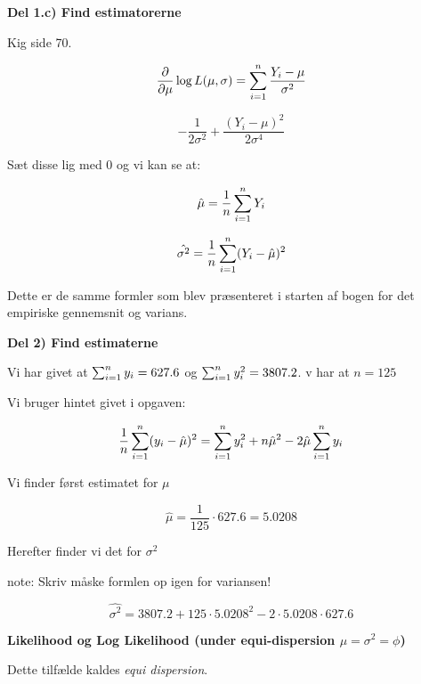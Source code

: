 \textbf{Del 1.c) Find estimatorerne}

Kig side 70.

\begin{equation}
    \frac{\partial}{\partial \mu} \log L (\mu, \sigma) = \sum_{i=1}^{n} \frac{Y_i - \mu}{\sigma^2}
\end{equation}

\begin{equation}
    - \frac{1}{2\sigma^2} + \frac{(Y_i - \mu)^2}{2\sigma^4}
\end{equation}

Sæt disse lig med 0 og vi kan se at:

\begin{equation}
    \hat{\mu} = \frac{1}{n}\sum_{i=1}^{n} Y_i
\end{equation}

\begin{equation}
    \hat{\sigma^2} = \frac{1}{n}\sum_{i=1}^{n} (Y_i - \hat{\mu})^2
\end{equation}

Dette er de samme formler som blev præsenteret i starten af bogen for det empiriske gennemsnit og varians.

\textbf{Del 2) Find estimaterne}

Vi har givet at $\sum_{i=1}^{n} y_i = 627.6$ og $\sum_{i=1}^{n} y_i^2 = 3807.2$. v har at $n=125$

Vi bruger hintet givet i opgaven:

\begin{equation}
    \frac{1}{n}\sum_{i=1}^{n} (y_i - \hat{\mu})^2 = \sum_{i=1}^{n} y_i^2 + n \hat{\mu}^2 - 2\hat{\mu} \sum_{i=1}^{n} y_i
\end{equation}

Vi finder først estimatet for $\mu$

\begin{equation}
    \hat{\mu} = \frac{1}{125} \cdot 627.6 = 5.0208
\end{equation}

Herefter finder vi det for $\sigma^2$

note: Skriv måske formlen op igen for variansen!

\begin{equation}
    \hat{\sigma^2} = 3807.2 + 125 \cdot 5.0208^2 - 2\cdot5.0208 \cdot 627.6
\end{equation}


\textbf{Likelihood og Log Likelihood (under equi-dispersion $\mu = \sigma^2 = \phi$)}


Dette tilfælde kaldes \textit{equi dispersion}.

